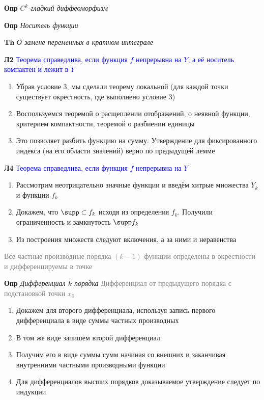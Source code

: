 \textbf{Опр} \textit{$C^k$-гладкий диффеоморфизм}

\textbf{Опр} \textit{Носитель функции}

\textbf{Th} \textit{О замене переменных в кратном интеграле}

\textbf{Л2}
\textcolor{blue}{Теорема справедлива, если функция $f$ непрерывна на $Y$, а её носитель компактен и лежит в  $Y$}

\begin{enumerate}
    \item Убрав условие 3, мы сделали теорему локальной (для каждой точки существует окрестность, где выполнено
    условие 3)
    \item Воспользуемся теоремой о расщеплении отображений, о неявной функции, критерием компактности, теоремой о
    разбиении единицы
    \item Это позволяет разбить функцию на сумму.
    Утверждение для фиксированного индекса (на его области значений) верно по предыдущей лемме
\end{enumerate}


\textbf{Л4}
\textcolor{blue}{Теорема справедлива, если функция $f$ непрерывна на $Y$}

\begin{enumerate}
    \item Рассмотрим неотрицательно значные функции и введём хитрые множества $Y_k$ и функции $f_k$
    \item Докажем, что $\supp \subset f_k$ исходя из определения $f_k$.
    Получили ограниченность и замкнутость $\supp f_k$
    \item Из построения множеств следуют включения, а за ними и неравенства
\end{enumerate}



\textcolor{gray}{Все частные производные порядка $(k - 1)$ функции определены в окрестности и дифференцируемы в точке}

\textbf{Опр} \textit{Дифференциал $k$ порядка}
\textcolor{gray}{Дифференциал от предыдущего порядка с подстановкой точки $x_0$}
\begin{enumerate}
    \item Докажем для второго дифференциала, используя запись первого дифференциала в виде суммы частных производных
    \item В том же виде запишем второй дифференциал
    \item Получим его в виде суммы сумм начиная со внешних и заканчивая внутренними частными производными функции
    \item Для дифференциалов высших порядков доказываемое утверждение следует по индукции
\end{enumerate}

